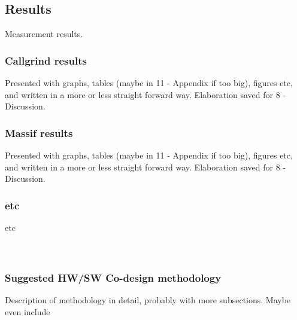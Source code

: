\subsection{Results}
Measurement results. \\

\subsubsection{Callgrind results}
Presented with graphs, tables (maybe in 11 - Appendix if too big), figures etc, and written in a more or less straight forward way. Elaboration saved for 8 - Discussion.\\

\subsubsection{Massif results}
Presented with graphs, tables (maybe in 11 - Appendix if too big), figures etc, and written in a more or less straight forward way. Elaboration saved for 8 - Discussion.\\

\subsubsection{etc}
etc\\\\\\

\subsubsection{Suggested HW/SW Co-design methodology}
Description of methodology in detail, probably with more subsections. Maybe even include
\\


\clearpage